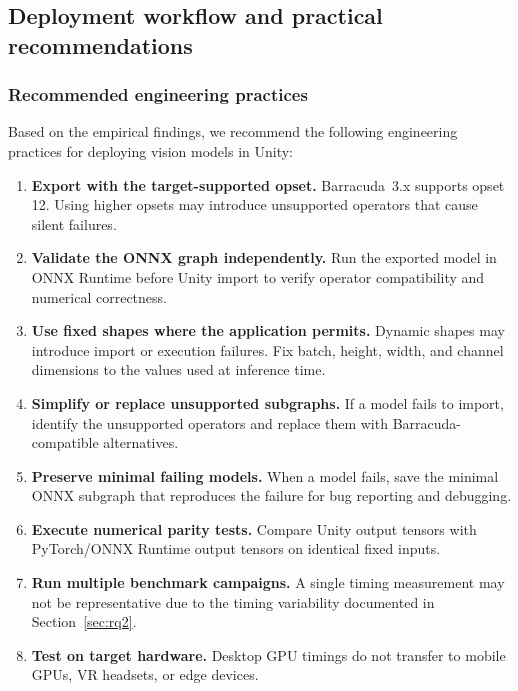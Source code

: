 \documentclass[10pt,twocolumn]{article}
\begin{document}
\subsection{Deployment workflow and practical recommendations}\label{sec:workflow}

\subsubsection{Recommended engineering practices}

Based on the empirical findings, we recommend the following engineering practices for deploying vision models in Unity:

\begin{enumerate}[nosep,leftmargin=*]
  \item \textbf{Export with the target-supported opset.} Barracuda~3.x supports opset 12. Using higher opsets may introduce unsupported operators that cause silent failures.
  \item \textbf{Validate the ONNX graph independently.} Run the exported model in ONNX Runtime before Unity import to verify operator compatibility and numerical correctness.
  \item \textbf{Use fixed shapes where the application permits.} Dynamic shapes may introduce import or execution failures. Fix batch, height, width, and channel dimensions to the values used at inference time.
  \item \textbf{Simplify or replace unsupported subgraphs.} If a model fails to import, identify the unsupported operators and replace them with Barracuda-compatible alternatives.
  \item \textbf{Preserve minimal failing models.} When a model fails, save the minimal ONNX subgraph that reproduces the failure for bug reporting and debugging.
  \item \textbf{Execute numerical parity tests.} Compare Unity output tensors with PyTorch/ONNX Runtime output tensors on identical fixed inputs.
  \item \textbf{Run multiple benchmark campaigns.} A single timing measurement may not be representative due to the timing variability documented in Section~\ref{sec:rq2}.
  \item \textbf{Test on target hardware.} Desktop GPU timings do not transfer to mobile GPUs, VR headsets, or edge devices.
\end{enumerate}
\end{document}
